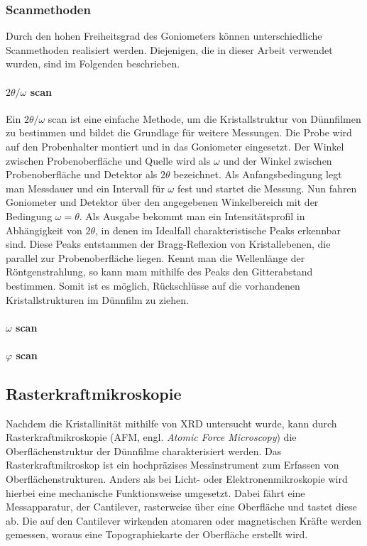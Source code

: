 \subsubsection{Scanmethoden}
Durch den hohen Freiheitsgrad des Goniometers können unterschiedliche Scanmethoden realisiert werden.
Diejenigen, die in dieser Arbeit verwendet wurden, sind im Folgenden beschrieben.

\paragraph{$2\theta/\omega$ scan}
Ein $2\theta/\omega$ scan ist eine einfache Methode, um die Kristallstruktur von Dünnfilmen zu bestimmen
und bildet die Grundlage für weitere Messungen.
Die Probe wird auf den Probenhalter montiert und in das Goniometer eingesetzt.
Der Winkel zwischen Probenoberfläche und Quelle wird als $\omega$ und der Winkel zwischen Probenoberfläche und Detektor
als $2\theta$ bezeichnet.
Als Anfangsbedingung legt man Messdauer und ein Intervall für $\omega$ fest und startet die Messung.
Nun fahren Goniometer und Detektor über den angegebenen Winkelbereich mit der Bedingung $\omega = \theta$.
Als Ausgabe bekommt man ein Intensitätsprofil in Abhängigkeit von $2\theta$, in denen im Idealfall charakteristische
Peaks erkennbar sind.
Diese Peaks entstammen der Bragg-Reflexion von Kristallebenen, die parallel zur Probenoberfläche liegen.
Kennt man die Wellenlänge der Röntgenstrahlung, so kann mam mithilfe des Peaks den Gitterabstand bestimmen.
Somit ist es möglich, Rückschlüsse auf die vorhandenen Kristallstrukturen im Dünnfilm zu ziehen.

\paragraph{$\omega$ scan}

\paragraph{$\varphi$ scan}

\subsection{Rasterkraftmikroskopie}\label{subsec:afm}
Nachdem die Kristallinität mithilfe von XRD untersucht wurde, kann durch Rasterkraftmikroskopie (AFM, engl.
\textit{Atomic Force Microscopy}) die Oberflächenstruktur der Dünnfilme charakterisiert werden.
Das Rasterkraftmikroskop ist ein hochpräzises Messinstrument zum Erfassen von Oberflächenstrukturen.
Anders als bei Licht- oder Elektronenmikroskopie wird hierbei eine mechanische Funktionsweise umgesetzt.
Dabei fährt eine Messapparatur, der Cantilever, rasterweise über eine Oberfläche und tastet diese ab.
Die auf den Cantilever wirkenden atomaren oder magnetischen Kräfte werden gemessen, woraus eine Topographiekarte der
Oberfläche erstellt wird.

